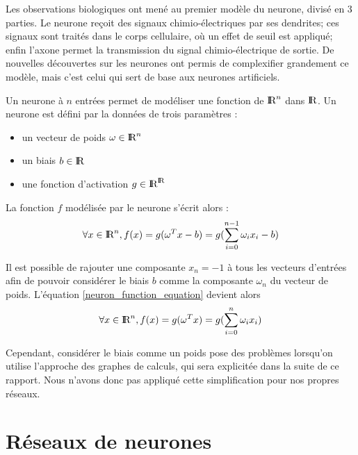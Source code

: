 Les observations biologiques ont mené au premier modèle du neurone, divisé en 3 parties. Le neurone reçoit des signaux chimio-électriques par ses dendrites; ces signaux sont traités dans le corps cellulaire, où un effet de seuil est appliqué; enfin l'axone permet la transmission du signal chimio-électrique de sortie. De nouvelles découvertes sur les neurones ont permis de complexifier grandement ce modèle, mais c'est celui qui sert de base aux neurones artificiels. \\

\begin{definition}[Neurone] 
Un neurone à $n$ entrées permet de modéliser une fonction de $\textrm{I\kern-0.21emR}^n$ dans $\textrm{I\kern-0.21emR}$. Un neurone est défini par la données de trois paramètres :
  \begin{itemize}
    \item un vecteur de poids $\omega \in \textrm{I\kern-0.21emR}^n$
    \item un biais $b \in \textrm{I\kern-0.21emR}$
    \item une fonction d'activation $g \in \textrm{I\kern-0.21emR}^{\textrm{I\kern-0.21emR}}$
  \end{itemize}

La fonction $f$ modélisée par le neurone s'écrit alors : 
  \begin{equation}
\forall x \in \textrm{I\kern-0.21emR}^n, f(x) = g(\omega^{T}x - b) = g(\sum_{i=0}^{n-1}\omega_{i}x_{i} - b)
  \label{neuron_function_equation}
  \end{equation}
\end{definition}    
\begin{remark}[Biais]
Il est possible de rajouter une composante $x_{n} = -1$ à tous les vecteurs d'entrées afin de pouvoir considérer le biais $b$ comme la composante $\omega_n$ du vecteur de poids. L'équation \eqref{neuron_function_equation} devient alors
  \begin{equation}
\forall x \in \textrm{I\kern-0.21emR}^n, f(x) = g(\omega^{T}x) = g(\sum_{i=0}^{n}\omega_{i}x_{i})  
  \label{corrected_neuron_function_equation}
  \end{equation}

Cependant, considérer le biais comme un poids pose des problèmes lorsqu'on utilise l'approche des graphes de calculs, qui sera explicitée dans la suite de ce rapport. Nous n'avons donc pas appliqué cette simplification pour nos propres réseaux.

\end{remark}

\section{Réseaux de neurones}

